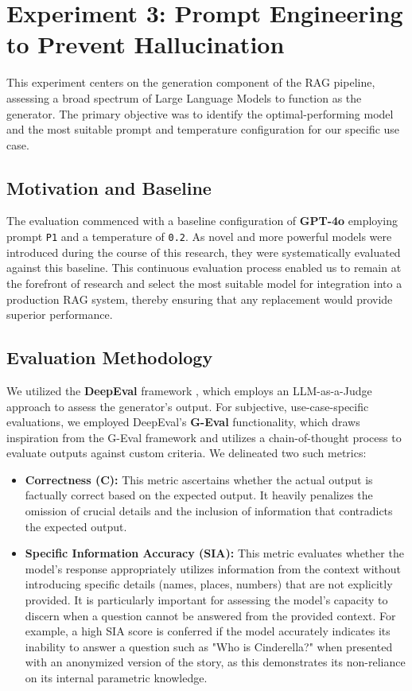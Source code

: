 \section{Experiment 3: Prompt Engineering to Prevent Hallucination}
\label{sec:exp_generator_prompt}
This experiment centers on the generation component of the RAG pipeline, assessing a broad spectrum of Large Language Models to function as the generator. The primary objective was to identify the optimal-performing model and the most suitable prompt and temperature configuration for our specific use case.

\subsection{Motivation and Baseline}
The evaluation commenced with a baseline configuration of \textbf{GPT-4o} employing prompt \texttt{P1} and a temperature of \texttt{0.2}. As novel and more powerful models were introduced during the course of this research, they were systematically evaluated against this baseline. This continuous evaluation process enabled us to remain at the forefront of research and select the most suitable model for integration into a production RAG system, thereby ensuring that any replacement would provide superior performance.

\subsection{Evaluation Methodology}\label{sec:evaluation-methodology}
We utilized the \textbf{DeepEval} framework \autocite{deepeval2023}, which employs an LLM-as-a-Judge approach to assess the generator's output. For subjective, use-case-specific evaluations, we employed DeepEval's \textbf{G-Eval} functionality, which draws inspiration from the G-Eval framework \autocite{liu2023geval} and utilizes a chain-of-thought process to evaluate outputs against custom criteria. We delineated two such metrics:
\begin{itemize}
    \item \textbf{Correctness (C):} This metric ascertains whether the actual output is factually correct based on the expected output. It heavily penalizes the omission of crucial details and the inclusion of information that contradicts the expected output.
    \item \textbf{Specific Information Accuracy (SIA):} This metric evaluates whether the model's response appropriately utilizes information from the context without introducing specific details (names, places, numbers) that are not explicitly provided. It is particularly important for assessing the model's capacity to discern when a question cannot be answered from the provided context. For example, a high SIA score is conferred if the model accurately indicates its inability to answer a question such as "Who is Cinderella?" when presented with an anonymized version of the story, as this demonstrates its non-reliance on its internal parametric knowledge.
\end{itemize}

